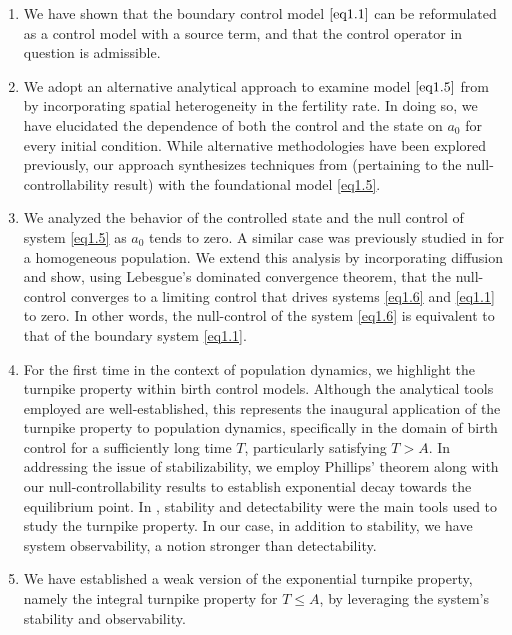 \documentclass[10pt, a4]{amsart}
\theoremstyle{plain}
\theoremstyle{definition}
\theoremstyle{remark}
\numberwithin{equation}{section}
\begin{document}
\begin{enumerate}
\item[•]  We have shown that the boundary control model \(\eqref{eq1.1}\) can be reformulated as a control model with a source term, and that the control operator in question is admissible.

\item[•]  We adopt an alternative analytical approach to examine model \(\eqref{eq1.5}\) from \cite{ref3} by incorporating spatial heterogeneity in the fertility rate. In doing so, we have elucidated the dependence of both the control and the state on \(a_0\) for every initial condition. While alternative methodologies have been explored previously, our approach synthesizes techniques from \cite{ref18} (pertaining to the null-controllability result) with the foundational model \eqref{eq1.5}.
 
\item[•] We analyzed the behavior of the controlled state and the null control of system \eqref{eq1.5} as \(a_0\) tends to zero. A similar case was previously studied in \cite{ref18} for a homogeneous population. We extend this analysis by incorporating diffusion and show, using Lebesgue’s dominated convergence theorem, that the null-control converges to a limiting control that drives systems \eqref{eq1.6} and \eqref{eq1.1} to zero. In other words, the null-control of the  system \eqref{eq1.6} is equivalent to that of the boundary system \eqref{eq1.1}.

\item[•] For the first time in the context of population dynamics, we highlight the turnpike property within birth control models. Although the analytical tools employed are well-established, this represents the inaugural application of the turnpike property to population dynamics, specifically in the domain of birth control for a sufficiently long time \(T\), particularly satisfying \(T > A\). In addressing the issue of stabilizability, we employ Phillips' theorem along with our null-controllability results to establish exponential decay towards the equilibrium point. In \cite{ref37}, stability and detectability were the main tools used to study the turnpike property. In our case, in addition to stability, we have system observability, a notion stronger than detectability.
\item[•]  We have established a weak version of the exponential turnpike property, namely the integral turnpike property for \(T \leq A\), by leveraging the system's stability and observability.
\end{enumerate}
\end{document}
